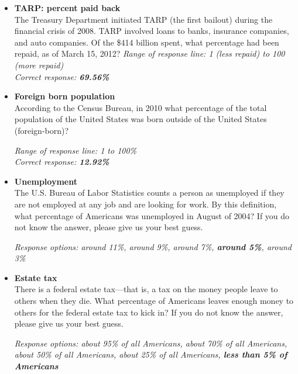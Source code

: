 \documentclass[12pt, letterpaper]{article}
\begin{document}
\begin{itemize}
\item \textbf{TARP: percent paid back} \\
The Treasury Department initiated TARP (the first bailout) during the financial crisis of 2008. TARP involved loans to banks, insurance companies, and auto companies. Of the \$414 billion spent, what percentage had been repaid, as of March 15, 2012?
 \textit{Range of response line: 1 (less repaid) to 100 (more repaid)}
\\ \textit{Correct response: \textbf{69.56\%}}
   \end{itemize}

\begin{itemize}
\item \textbf{Foreign born population} \\
According to the Census Bureau, in 2010 what percentage of the total population of the United States was born outside of the United States (foreign-born)?

 \textit{Range of response line: 1 to 100\%}
\\ \textit{Correct response: \textbf{12.92\%}}
   \end{itemize}

\vspace{.2in}

\large {}

\vspace{.2in}

\normalsize
\begin{itemize}
\item \textbf{Unemployment} \\
The U.S. Bureau of Labor Statistics counts a person as unemployed if they are not employed at any job and are looking for work. By this definition, what percentage of Americans was unemployed in August of 2004? If you do not know the answer, please give us your best guess.

 \textit{Response options: around 11\%, around 9\%, around 7\%, \textbf{around 5\%}, around 3\%}
   \end{itemize}

\begin{itemize}
\item \textbf{Estate tax} \\
There is a federal estate tax---that is, a tax on the money people leave to others when they die. What percentage of Americans leaves enough money to others for the federal estate tax to kick in? If you do not know the answer, please give us your best guess.

 \textit{Response options: about 95\% of all Americans, about 70\% of all Americans, about 50\% of all Americans, about 25\% of all Americans, \textbf{less than 5\% of Americans}}
   \end{itemize}
\end{document}
